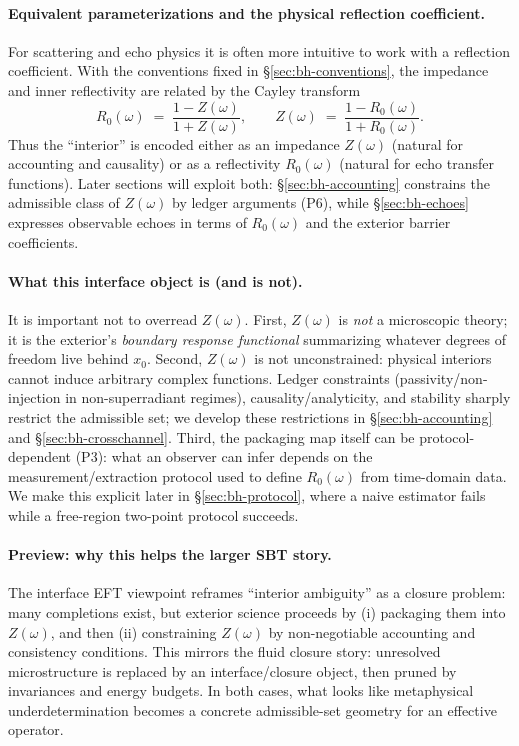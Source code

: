 \paragraph{Equivalent parameterizations and the physical reflection coefficient.}
For scattering and echo physics it is often more intuitive to work with a reflection coefficient. With the conventions fixed in \S\ref{sec:bh-conventions}, the impedance and inner reflectivity are related by the Cayley transform
\begin{equation}
  R_0(\omega) \;=\; \frac{1 - Z(\omega)}{1 + Z(\omega)},
  \qquad
  Z(\omega) \;=\; \frac{1 - R_0(\omega)}{1 + R_0(\omega)}.
  \label{eq:bh-RZ-interface}
\end{equation}
Thus the ``interior'' is encoded either as an impedance $Z(\omega)$ (natural for accounting and causality) or as a reflectivity $R_0(\omega)$ (natural for echo transfer functions). Later sections will exploit both: \S\ref{sec:bh-accounting} constrains the admissible class of $Z(\omega)$ by ledger arguments (P6), while \S\ref{sec:bh-echoes} expresses observable echoes in terms of $R_0(\omega)$ and the exterior barrier coefficients.

\paragraph{What this interface object is (and is not).}
It is important not to overread $Z(\omega)$.
First, $Z(\omega)$ is \emph{not} a microscopic theory; it is the exterior’s \emph{boundary response functional} summarizing whatever degrees of freedom live behind $x_0$.
Second, $Z(\omega)$ is not unconstrained: physical interiors cannot induce arbitrary complex functions. Ledger constraints (passivity/non-injection in non-superradiant regimes), causality/analyticity, and stability sharply restrict the admissible set; we develop these restrictions in \S\ref{sec:bh-accounting} and \S\ref{sec:bh-crosschannel}.
Third, the packaging map itself can be protocol-dependent (P3): what an observer can infer depends on the measurement/extraction protocol used to define $R_0(\omega)$ from time-domain data. We make this explicit later in \S\ref{sec:bh-protocol}, where a naive estimator fails while a free-region two-point protocol succeeds.

\paragraph{Preview: why this helps the larger SBT story.}
The interface EFT viewpoint reframes ``interior ambiguity'' as a closure problem: many completions exist, but exterior science proceeds by (i) packaging them into $Z(\omega)$, and then (ii) constraining $Z(\omega)$ by non-negotiable accounting and consistency conditions. This mirrors the fluid closure story: unresolved microstructure is replaced by an interface/closure object, then pruned by invariances and energy budgets. In both cases, what looks like metaphysical underdetermination becomes a concrete admissible-set geometry for an effective operator.
